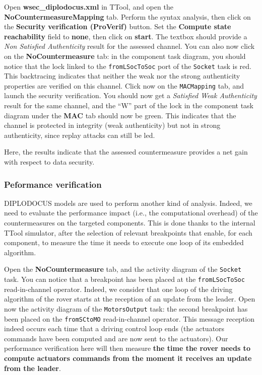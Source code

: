 \documentclass{article}
\begin{document}
Open \textbf{wsec\_diplodocus.xml} in TTool, and open the \textbf{NoCountermeasureMapping} tab. Perform the syntax analysis, then click on the \textbf{Security verification (ProVerif)} button. Set the \textbf{Compute state reachability} field to \textbf{none}, then click on \textbf{start}. The textbox should provide a \emph{Non Satisfied Authenticity} result for the assessed channel. You can also now click on the \textbf{NoCountermeasure} tab: in the component task diagram, you should notice that the lock linked to the \texttt{fromLSocToSoc} port of the \texttt{Socket} task is red. This backtracing indicates that neither the weak nor the strong authenticity properties are verified on this channel. Click now on the \texttt{MACMapping} tab, and launch the security verification. You should now get a \emph{Satisfied Weak Authenticity} result for the same channel, and the ``W'' part of the lock in the component task diagram under the \textbf{MAC} tab should now be green. This indicates that the channel is protected in integrity (weak authenticity) but not in strong authenticity, since replay attacks can still be led.

Here, the results indicate that the assessed countermeasure provides a net gain with respect to data security.

\subsubsection{Peformance verification}

DIPLODOCUS models are used to perform another kind of analysis. Indeed, we need to evaluate the performance impact (i.e., the computational overhead) of the countermeasures on the targeted components. This is done thanks to the internal TTool simulator, after the selection of relevant breakpoints that enable, for each component, to measure the time it needs to execute one loop of its embedded algorithm.

Open the \textbf{NoCountermeasure} tab, and the activity diagram of the \texttt{Socket} task. You can notice that a breakpoint has been placed at the \texttt{fromLSocToSoc} read-in-channel operator. Indeed, we consider that one loop of the driving algorithm of the rover starts at the reception of an update from the leader. Open now the activity diagram of the \texttt{MotorsOutput} task: the second breakpoint has been placed on the \texttt{fromSCtoMO} read-in-channel operator. This message reception indeed occurs each time that a driving control loop ends (the actuators commands have been computed and are now sent to the actuators). Our performance verification here will then measure \textbf{the time the rover needs to compute actuators commands from the moment it receives an update from the leader}.
\end{document}
